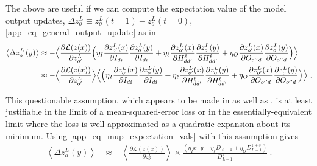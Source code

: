 The above are useful if we can compute the expectation value of the model output updates, $
\Delta z^{ L }_{ o }\equiv z^{ L }_{ o }(t=1) -z^{ L }_{ o }(t=0) $,
\eqref{app_eq_general_output_update} as in
\begin{align}
    \left \langle \Delta z^{ L }_{ o }\left ( y \right ) \right \rangle &\approx
    - \Big \langle \frac{ \partial \mathcal{L}(z(x)) }{\partial z ^{ L }_{ o' }  }\Big( \eta_{ I } \frac{ \partial z ^{ L }_{ o' }(x) }{ \partial I_{ di } }\frac{ \partial z^{ L }_{ o }(y) }{ \partial I_{ di } }
    + \eta_{ \ell }\frac{ \partial z ^{ L }_{ o' }(x) }{ \partial H^{ \ell }_{ dd' } }\frac{ \partial z^{ L }_{ o }(y) }{ \partial H^{ \ell }_{ dd' } }
    + \eta_{ O }\frac{ \partial z ^{ L }_{ o' }(x) }{ \partial O_{ o''d } }\frac{ \partial z^{ L }_{ o }(y) }{ \partial O_{ o''d  } } \Big ) \Big \rangle\nonumber\\
    &\approx
    - \Big \langle \frac{ \partial \mathcal{L}(z(x)) }{\partial z ^{ L }_{ o' }  }\Big\rangle \Big\langle\Big( \eta_{ I } \frac{ \partial z ^{ L }_{ o' }(x) }{ \partial I_{ di } }\frac{ \partial z^{ L }_{ o }(y) }{ \partial I_{ di } }
    + \eta_{ \ell }\frac{ \partial z ^{ L }_{ o' }(x) }{ \partial H^{ \ell }_{ dd' } }\frac{ \partial z^{ L }_{ o }(y) }{ \partial H^{ \ell }_{ dd' } }
    + \eta_{ O }\frac{ \partial z ^{ L }_{ o' }(x) }{ \partial O_{ o''d } }\frac{ \partial z^{ L }_{ o }(y) }{ \partial O_{ o''d  } } \Big ) \Big \rangle \ .
\end{align}

This questionable assumption, which appears to be made in \cite{yang2022tensor} as well as
\cite{physicalDL}, is at least justifiable in the limit of a mean-squared-error loss or in the
essentially-equivalent limit where the loss is well-approximated as a quadratic expansion about its
minimum. Using \eqref{app_eq_mup_expectation_vals} with this assumption gives
\begin{align}
    \left \langle \Delta z^{ L }_{ o }\left ( y \right ) \right \rangle &\approx
    - \left \langle \frac{ \partial \mathcal{L}(z(x)) }{\partial z ^{ L }_{ o }  }\right\rangle \times  \frac{ \left ( \eta_{ I } x \cdot y
    + \eta_{ \ell }  D_{ \ell-1 }
+ \eta_{ O }D^{1+s}_{ L-1 } \right )}{D^{ s }_{ L-1 }} \ . \label{app_eq_deltaz_scaling}
\end{align}

